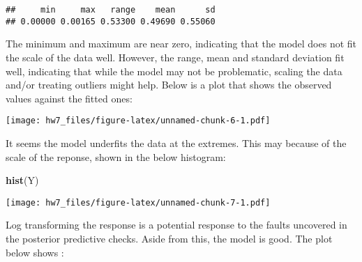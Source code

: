 \documentclass[
]{article}
\newenvironment{Shaded}{\begin{snugshade}}{\end{snugshade}}
\newcommand{\AttributeTok}[1]{\textcolor[rgb]{0.13,0.29,0.53}{#1}}
\newcommand{\CommentTok}[1]{\textcolor[rgb]{0.56,0.35,0.01}{\textit{#1}}}
\newcommand{\DecValTok}[1]{\textcolor[rgb]{0.00,0.00,0.81}{#1}}
\newcommand{\FunctionTok}[1]{\textcolor[rgb]{0.13,0.29,0.53}{\textbf{#1}}}
\newcommand{\NormalTok}[1]{#1}
\newcommand{\OtherTok}[1]{\textcolor[rgb]{0.56,0.35,0.01}{#1}}
\newcommand{\SpecialCharTok}[1]{\textcolor[rgb]{0.81,0.36,0.00}{\textbf{#1}}}
\newcommand{\StringTok}[1]{\textcolor[rgb]{0.31,0.60,0.02}{#1}}
\begin{document}
\begin{verbatim}
##     min     max   range    mean      sd 
## 0.00000 0.00165 0.53300 0.49690 0.55060
\end{verbatim}

The minimum and maximum are near zero, indicating that the model does
not fit the scale of the data well. However, the range, mean and
standard deviation fit well, indicating that while the model may not be
problematic, scaling the data and/or treating outliers might help. Below
is a plot that shows the observed values against the fitted ones:

\begin{Shaded}
\end{Shaded}

\texttt{[image: hw7\_files/figure-latex/unnamed-chunk-6-1.pdf]}

It seems the model underfits the data at the extremes. This may because
of the scale of the reponse, shown in the below histogram:

\begin{Shaded}
\begin{Highlighting}[]
\FunctionTok{hist}\NormalTok{(Y)}
\end{Highlighting}
\end{Shaded}

\texttt{[image: hw7\_files/figure-latex/unnamed-chunk-7-1.pdf]}

Log transforming the response is a potential response to the faults
uncovered in the posterior predictive checks. Aside from this, the model
is good. The plot below shows :
\end{document}
